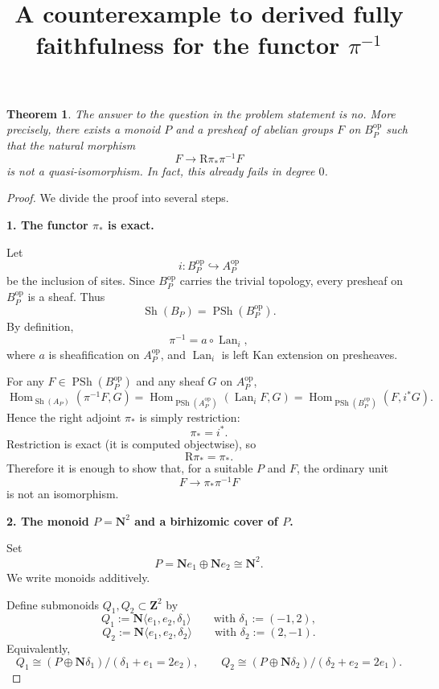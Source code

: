 \documentclass[11pt]{article}
\newtheorem{theorem}{Theorem}
\begin{document}
\title{A counterexample to derived fully faithfulness for the functor \(\pi^{-1}\)}
\author{}
\date{}
\maketitle

\begin{theorem}
The answer to the question in the problem statement is \emph{no}. More precisely, there exists a monoid \(P\) and a presheaf of abelian groups \(F\) on \(B_P^{\mathrm{op}}\) such that the natural morphism
\[
F \longrightarrow \mathrm R\pi_\ast \pi^{-1}F
\]
is not a quasi-isomorphism. In fact, this already fails in degree \(0\).
\end{theorem}

\begin{proof}
We divide the proof into several steps.

\medskip
\noindent
\textbf{1. The functor \(\pi_\ast\) is exact.}

Let
\[
i \colon B_P^{\mathrm{op}} \hookrightarrow A_P^{\mathrm{op}}
\]
be the inclusion of sites. Since \(B_P^{\mathrm{op}}\) carries the trivial topology, every presheaf on \(B_P^{\mathrm{op}}\) is a sheaf. Thus
\[
\operatorname{Sh}(B_P)=\operatorname{PSh}(B_P^{\mathrm{op}}).
\]
By definition,
\[
\pi^{-1}=a\circ \operatorname{Lan}_i,
\]
where \(a\) is sheafification on \(A_P^{\mathrm{op}}\), and \(\operatorname{Lan}_i\) is left Kan extension on presheaves.

For any \(F\in \operatorname{PSh}(B_P^{\mathrm{op}})\) and any sheaf \(G\) on \(A_P^{\mathrm{op}}\),
\[
\operatorname{Hom}_{\operatorname{Sh}(A_P)}(\pi^{-1}F,G)
=
\operatorname{Hom}_{\operatorname{PSh}(A_P^{\mathrm{op}})}(\operatorname{Lan}_iF,G)
=
\operatorname{Hom}_{\operatorname{PSh}(B_P^{\mathrm{op}})}(F,i^\ast G).
\]
Hence the right adjoint \(\pi_\ast\) is simply restriction:
\[
\pi_\ast = i^\ast.
\]
Restriction is exact (it is computed objectwise), so
\[
\mathrm R\pi_\ast = \pi_\ast.
\]
Therefore it is enough to show that, for a suitable \(P\) and \(F\), the ordinary unit
\[
F \longrightarrow \pi_\ast \pi^{-1}F
\]
is not an isomorphism.

\medskip
\noindent
\textbf{2. The monoid \(P=\mathbf N^2\) and a birhizomic cover of \(P\).}

Set
\[
P=\mathbf N e_1 \oplus \mathbf N e_2 \cong \mathbf N^2.
\]
We write monoids additively.

Define submonoids \(Q_1,Q_2\subset \mathbf Z^2\) by
\[
Q_1 := \mathbf N\langle e_1,e_2,\delta_1\rangle
\qquad\text{with }\delta_1:=(-1,2),
\]
\[
Q_2 := \mathbf N\langle e_1,e_2,\delta_2\rangle
\qquad\text{with }\delta_2:=(2,-1).
\]
Equivalently,
\[
Q_1 \cong (P\oplus \mathbf N\delta_1)/(\delta_1+e_1=2e_2),
\qquad
Q_2 \cong (P\oplus \mathbf N\delta_2)/(\delta_2+e_2=2e_1).
\]


\end{proof}
\end{document}
